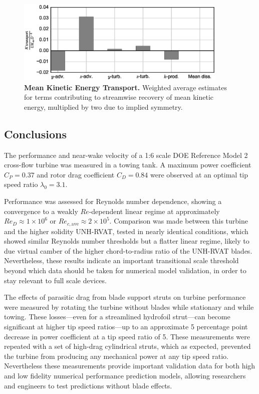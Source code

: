 \documentclass[10pt,letterpaper]{article}
\begin{document}
\begin{figure}[ht!]
    \includegraphics[width=0.9\textwidth]{figures/K_trans_bar_graph.eps}

    \caption{{\bf Mean Kinetic Energy Transport.} Weighted average estimates for
    terms contributing to streamwise recovery of mean kinetic energy, multiplied
    by two due to implied symmetry.}

    \label{fig:Ktransport}
\end{figure}


\subsection*{Conclusions}

The performance and near-wake velocity of a 1:6 scale DOE Reference Model 2
cross-flow turbine was measured in a towing tank. A maximum power coefficient
$C_P = 0.37$ and rotor drag coefficient $C_D = 0.84$ were observed at an optimal
tip speed ratio $\lambda_0 = 3.1$.

Performance was assessed for Reynolds number dependence, showing a convergence
to a weakly $Re$-dependent linear regime at approximately $Re_D \approx 1 \times
10^6$ or $Re_{c,\mathrm{ave}} \approx 2 \times 10^5$. Comparison was made
between this turbine and the higher solidity UNH-RVAT, tested in nearly
identical conditions, which showed similar Reynolds number thresholds but a
flatter linear regime, likely to due virtual camber of the higher
chord-to-radius ratio of the UNH-RVAT blades. Nevertheless, these results
indicate an important transitional scale threshold beyond which data should be
taken for numerical model validation, in order to stay relevant to full scale
devices.

The effects of parasitic drag from blade support struts on turbine performance
were measured by rotating the turbine without blades while stationary and while
towing. These losses---even for a streamlined hydrofoil strut---can become
significant at higher tip speed ratios---up to an approximate 5 percentage point
decrease in power coefficient at a tip speed ratio of 5. These measurements were
repeated with a set of high-drag cylindrical struts, which as expected,
prevented the turbine from producing any mechanical power at any tip speed
ratio. Nevertheless these measurements provide important validation data for
both high and low fidelity numerical performance prediction models, allowing
researchers and engineers to test predictions without blade effects.
\end{document}
